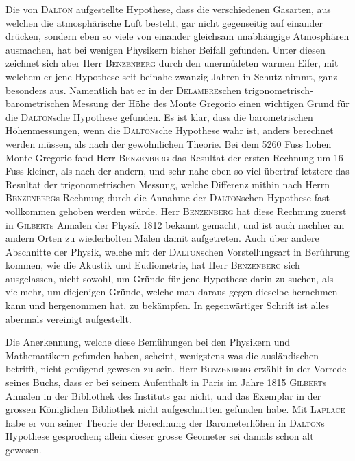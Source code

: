 \documentclass[12pt,a4paper]{article}
\begin{document}
\smallskip
\noindent
Die von \textsc{Dalton} aufgestellte Hypothese, dass die verschiedenen Gasarten, aus welchen die atmosph\"arische Luft besteht, gar nicht gegenseitig auf einander dr\"ucken, sondern eben so viele von einander gleichsam unabh\"angige Atmosph\"aren ausmachen, hat bei wenigen Physikern bisher Beifall gefunden. Unter diesen zeichnet sich aber Herr \textsc{Benzenberg} durch den unerm\"udeten warmen Eifer, mit welchem er jene Hypothese seit beinahe zwanzig Jahren in Schutz nimmt, ganz besonders aus. Namentlich hat er in der \textsc{Delambre}schen trigonometrisch-barometrischen Messung der H\"ohe des Monte Gregorio einen wichtigen Grund f\"ur die \textsc{Dalton}sche Hypothese gefunden. Es ist klar, dass die barometrischen H\"ohenmessungen, wenn die \textsc{Dalton}sche Hypothese wahr ist, anders berechnet werden m\"ussen, als nach der gew\"ohnlichen Theorie. Bei dem 5260 Fuss hohen Monte Gregorio fand Herr \textsc{Benzenberg} das Resultat der ersten Rechnung um 16 Fuss kleiner, als nach der andern, und sehr nahe eben so viel \"ubertraf letztere das Resultat der trigonometrischen Messung, welche Differenz mithin nach Herrn \textsc{Benzenberg}s Rechnung durch die Annahme der \textsc{Dalton}schen Hypothese fast vollkommen gehoben werden w\"urde. Herr \textsc{Benzenberg} hat diese Rechnung zuerst in \textsc{Gilbert}s Annalen der Physik 1812 bekannt gemacht, und ist auch nachher an andern Orten zu wiederholten Malen damit aufgetreten. Auch \"uber andere Abschnitte der Physik, welche mit der \textsc{Dalton}schen Vorstellungsart in Ber\"uhrung kommen, wie die Akustik und Eudiometrie, hat Herr \textsc{Benzenberg} sich ausgelassen, nicht sowohl, um Gr\"unde f\"ur jene Hypothese darin zu suchen, als vielmehr, um diejenigen Gr\"unde, welche man daraus gegen dieselbe hernehmen kann und hergenommen hat, zu bek\"ampfen. In gegenw\"artiger Schrift ist alles abermals vereinigt aufgestellt.

Die Anerkennung, welche diese Bem\"uhungen bei den Physikern und Mathematikern gefunden haben, scheint, wenigstens was die ausl\"andischen betrifft, nicht gen\"ugend gewesen zu sein. Herr \textsc{Benzenberg} erz\"ahlt in der Vorrede seines Buchs, dass er bei seinem Aufenthalt in Paris im Jahre 1815 \textsc{Gilbert}s Annalen in der Bibliothek des Instituts gar nicht, und das Exemplar in der grossen K\"oniglichen Bibliothek nicht aufgeschnitten gefunden habe. Mit \textsc{Laplace} habe er von seiner Theorie der Berechnung der Barometerh\"ohen in \textsc{Dalton}s Hypothese gesprochen; allein dieser grosse Geometer sei damals schon alt gewesen.
\end{document}
